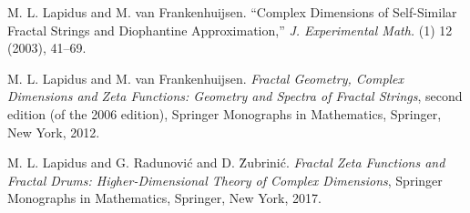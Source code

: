 \documentclass{if-beamer}
\begin{document}
\begin{frame}[allowframebreaks]
\begin{thebibliography}{1}
M. L. Lapidus and M. van Frankenhuijsen.
``Complex Dimensions of Self-Similar Fractal Strings and Diophantine Approximation,''  
\textit{J. Experimental Math.}
(1)
12
(2003),
41--69. 

M. L. Lapidus and M. van Frankenhuijsen.
\textit{Fractal Geometry, Complex Dimensions and Zeta Functions: Geometry and Spectra of Fractal Strings}, second edition (of the 2006 edition),
Springer Monographs in Mathematics, Springer, New York, 2012.

M. L. Lapidus and G. Radunovi\'c and D. {\u Z}ubrini\'c.
\textit{Fractal Zeta Functions and Fractal Drums: Higher-Dimensional Theory of Complex Dimensions},
Springer Monographs in Mathematics, Springer, New York, 2017.

%
%
%

\end{thebibliography}

\end{frame}
\end{document}
